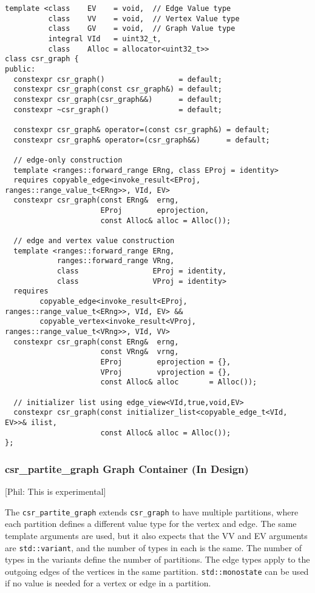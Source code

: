 \documentclass[10pt,onecolumn]{article}
\newcommand{\tcode}[1]{\lstinline[breaklines=true]{#1}}
\newcommand{\comment}[2]{{\color{comment}[{\sc #1:} \textsf{#2}]}}
\newcommand{\phil}[1]{\comment{Phil}{#1}}
\begin{document}
\begin{lstlisting}
template <class    EV    = void,  // Edge Value type
          class    VV    = void,  // Vertex Value type
          class    GV    = void,  // Graph Value type
          integral VId   = uint32_t, 
          class    Alloc = allocator<uint32_t>>
class csr_graph {
public:
  constexpr csr_graph()                 = default;
  constexpr csr_graph(const csr_graph&) = default;
  constexpr csr_graph(csr_graph&&)      = default;
  constexpr ~csr_graph()                = default;

  constexpr csr_graph& operator=(const csr_graph&) = default;
  constexpr csr_graph& operator=(csr_graph&&)      = default;
  
  // edge-only construction
  template <ranges::forward_range ERng, class EProj = identity>
  requires copyable_edge<invoke_result<EProj, ranges::range_value_t<ERng>>, VId, EV>
  constexpr csr_graph(const ERng&  erng, 
                      EProj        eprojection, 
                      const Alloc& alloc = Alloc());

  // edge and vertex value construction
  template <ranges::forward_range ERng, 
            ranges::forward_range VRng, 
            class                 EProj = identity, 
            class                 VProj = identity>
  requires 
        copyable_edge<invoke_result<EProj, ranges::range_value_t<ERng>>, VId, EV> &&
        copyable_vertex<invoke_result<VProj, ranges::range_value_t<VRng>>, VId, VV>
  constexpr csr_graph(const ERng&  erng,
                      const VRng&  vrng,
                      EProj        eprojection = {},
                      VProj        vprojection = {},
                      const Alloc& alloc       = Alloc());

  // initializer list using edge_view<VId,true,void,EV>
  constexpr csr_graph(const initializer_list<copyable_edge_t<VId, EV>>& ilist, 
                      const Alloc& alloc = Alloc());
};
\end{lstlisting}

\subsubsection{csr\_partite\_graph Graph Container (In Design)}
\phil{This is experimental}

The \tcode{csr_partite_graph} extends \tcode{csr_graph} to have multiple partitions, where each partition defines a different value type for the vertex and edge. The same template arguments are used, but it also expects that the VV and EV arguments are \tcode{std::variant}, and the number of types in each is the same. The number of types in the variants define the number of partitions. The edge types apply to the outgoing edges of the vertices in the same partition. \tcode{std::monostate} can be used if no value is needed for a vertex or edge in a partition.
\end{document}
